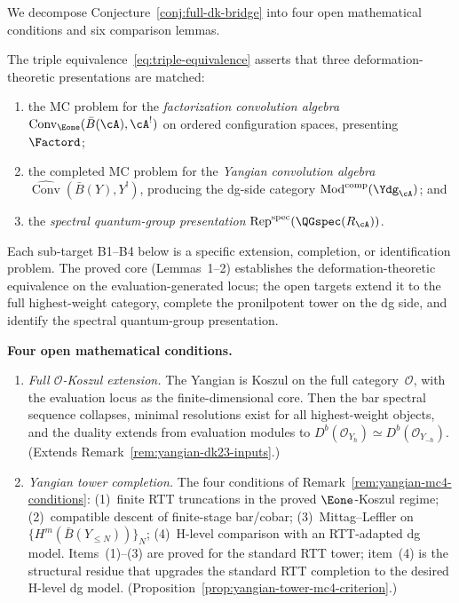 \begin{remark}
\label{rem:bridge-theorem-comparison}
We decompose
Conjecture~\ref{conj:full-dk-bridge} into four open mathematical conditions and
six comparison lemmas.

\smallskip\noindent
The triple equivalence~\eqref{eq:triple-equivalence} asserts that
three deformation-theoretic presentations are matched:
\begin{enumerate}[label=\textup{(\roman*)}]
\item the MC problem for the \emph{factorization convolution algebra}
 $\operatorname{Conv}_{\Eone}(\bar B(\cA), \cA^!)$ on ordered configuration
 spaces, presenting~$\Factord$;
\item the completed MC problem for the \emph{Yangian convolution algebra}
 $\widehat{\operatorname{Conv}}(\bar B(Y), Y^!)$, producing
 the dg-side category
 $\operatorname{Mod}^{\mathrm{comp}}(\Ydg_\cA)$; and
\item the \emph{spectral quantum-group presentation}
 $\operatorname{Rep}^{\mathrm{spec}}(\QGspec(R_\cA))$.
\end{enumerate}
Each sub-target B1--B4 below is a specific extension, completion, or
identification problem. The proved core (Lemmas~1--2) establishes
the deformation-theoretic equivalence on the evaluation-generated
locus; the open targets extend it to the full highest-weight
category, complete the pronilpotent tower on the dg side, and
identify the spectral quantum-group presentation.

\medskip\noindent
\textbf{Four open mathematical conditions.}
\begin{enumerate}[label=\textup{B\arabic*.}]
\item \label{item:B1}
 \emph{Full $\mathcal{O}$-Koszul extension.}
 The Yangian is Koszul on the full category~$\mathcal{O}$, with the
 evaluation locus as the finite-dimensional core. Then the bar spectral sequence collapses,
 minimal resolutions exist for all highest-weight objects, and
 the duality extends from evaluation modules to
 $D^b(\mathcal{O}_{Y_\hbar}) \simeq D^b(\mathcal{O}_{Y_{-\hbar}})$.
 (Extends Remark~\ref{rem:yangian-dk23-inputs}.)

\item \label{item:B2}
 \emph{Yangian tower completion.}
 The four conditions of Remark~\ref{rem:yangian-mc4-conditions}:
 (1)~finite RTT truncations in the proved $\Eone$-Koszul regime;
 (2)~compatible descent of finite-stage bar/cobar;
 (3)~Mittag--Leffler on $\{H^m(\bar B(Y_{\le N}))\}_N$;
 (4)~H-level comparison with an RTT-adapted dg model.
 Items~(1)--(3) are proved for the standard RTT tower; item~(4)
 is the structural residue that upgrades the standard RTT
 completion to the desired H-level dg model.
 (Proposition~\ref{prop:yangian-tower-mc4-criterion}.)


\end{enumerate}
\end{remark}
